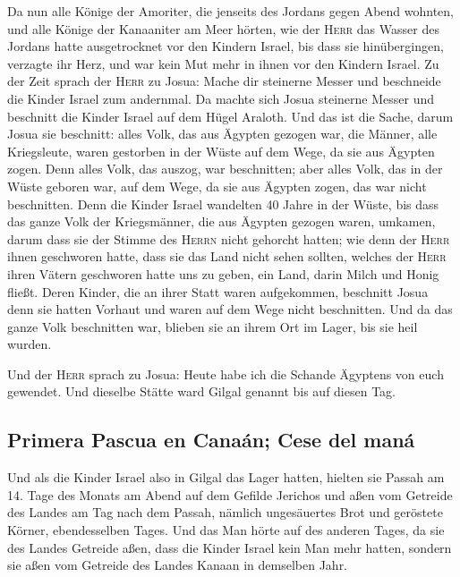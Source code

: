 Da nun alle Könige der Amoriter, die jenseits des Jordans
gegen Abend wohnten, und alle Könige der Kanaaniter am Meer hörten, wie
der \textsc{Herr} das Wasser des Jordans hatte ausgetrocknet vor den
Kindern Israel, bis dass sie hinübergingen, verzagte ihr Herz, und war
kein Mut mehr in ihnen vor den Kindern Israel.  Zu der
Zeit sprach der \textsc{Herr} zu Josua: Mache dir steinerne Messer und
beschneide die Kinder Israel zum andernmal.  Da machte
sich Josua steinerne Messer und beschnitt die Kinder Israel auf dem
Hügel Araloth.  Und das ist die Sache, darum Josua sie
beschnitt: alles Volk, das aus Ägypten gezogen war, die Männer, alle
Kriegsleute, waren gestorben in der Wüste auf dem Wege, da sie aus
Ägypten zogen.  Denn alles Volk, das auszog, war
beschnitten; aber alles Volk, das in der Wüste geboren war, auf dem
Wege, da sie aus Ägypten zogen, das war nicht beschnitten.
 Denn die Kinder Israel wandelten 40 Jahre in der Wüste,
bis dass das ganze Volk der Kriegsmänner, die aus Ägypten gezogen waren,
umkamen, darum dass sie der Stimme des \textsc{Herrn} nicht gehorcht
hatten; wie denn der \textsc{Herr} ihnen geschworen hatte, dass sie das
Land nicht sehen sollten, welches der \textsc{Herr} ihren Vätern
geschworen hatte uns zu geben, ein Land, darin Milch und Honig fließt.
 Deren Kinder, die an ihrer Statt waren aufgekommen,
beschnitt Josua denn sie hatten Vorhaut und waren auf dem Wege nicht
beschnitten.  Und da das ganze Volk beschnitten war,
blieben sie an ihrem Ort im Lager, bis sie heil wurden.

 Und der \textsc{Herr} sprach zu Josua: Heute habe ich die
Schande Ägyptens von euch gewendet. Und dieselbe Stätte ward Gilgal
genannt bis auf diesen Tag.

\hypertarget{primera-pascua-en-canauxe1n-cese-del-manuxe1}{%
\subsection{Primera Pascua en Canaán; Cese del
maná}\label{primera-pascua-en-canauxe1n-cese-del-manuxe1}}

 Und als die Kinder Israel also in Gilgal das Lager
hatten, hielten sie Passah am 14. Tage des Monats am Abend auf dem
Gefilde Jerichos  und aßen vom Getreide des Landes am Tag
nach dem Passah, nämlich ungesäuertes Brot und geröstete Körner,
ebendesselben Tages.  Und das Man hörte auf des anderen
Tages, da sie des Landes Getreide aßen, dass die Kinder Israel kein Man
mehr hatten, sondern sie aßen vom Getreide des Landes Kanaan in
demselben Jahr.

